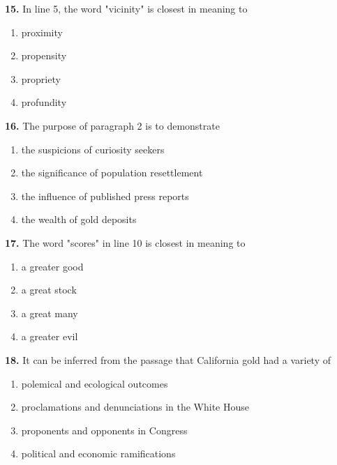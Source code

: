 \documentclass[12pt]{article}
\begin{document}
\par
\vspace{0.25\baselineskip}
\noindent\textbf{15.} In line 5, the word "vicinity" is closest in meaning to
\begin{enumerate}[label=(\Alph*),leftmargin=*,itemsep=0.2em]
\item proximity
\item propensity
\item propriety
\item profundity
\end{enumerate}
\par
\vspace{0.25\baselineskip}
\noindent\textbf{16.} The purpose of paragraph 2 is to demonstrate
\begin{enumerate}[label=(\Alph*),leftmargin=*,itemsep=0.2em]
\item the suspicions of curiosity seekers
\item the significance of population resettlement
\item the influence of published press reports
\item the wealth of gold deposits
\end{enumerate}
\par
\vspace{0.25\baselineskip}
\noindent\textbf{17.} The word "scores" in line 10 is closest in meaning to
\begin{enumerate}[label=(\Alph*),leftmargin=*,itemsep=0.2em]
\item a greater good
\item a great stock
\item a great many
\item a greater evil
\end{enumerate}
\par
\vspace{0.25\baselineskip}
\noindent\textbf{18.} It can be inferred from the passage that California gold had a variety of
\begin{enumerate}[label=(\Alph*),leftmargin=*,itemsep=0.2em]
\item polemical and ecological outcomes
\item proclamations and denunciations in the White House
\item proponents and opponents in Congress
\item political and economic ramifications
\end{enumerate}
\par
\vspace{0.25\baselineskip}
\end{document}
